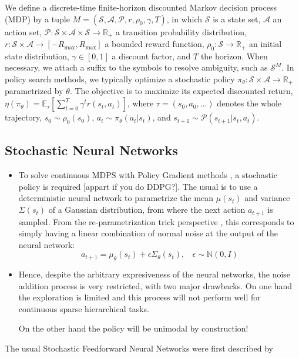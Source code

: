 \documentclass{article} %
\newcommand{\sset}{\mathcal{S}}
\newcommand{\aset}{\mathcal{A}}
\newcommand{\trans}{\mathcal{P}}
\begin{document}
    
    We define a discrete-time finite-horizon discounted Markov decision process (MDP) by a tuple $M = (\sset, \aset, \trans, r, \rho_0, \gamma, T)$, in which $\sset$ is a state set, $\aset$ an action set, $\trans: \sset \times \aset \times \sset \rightarrow \mathbb{R}_{+}$ a transition probability distribution, $r: \sset \times \aset \rightarrow [-R_{\max}, R_{\max}]$ a bounded reward function, $\rho_0: \sset \to \mathbb{R}_+$ an initial state distribution, $\gamma \in [0, 1]$ a discount factor, and $T$ the horizon. When necessary, we attach a suffix to the symbols to resolve ambiguity, such as $\sset^M$. In policy search methods, we typically optimize a stochastic policy $\pi_{\theta}: \sset \times \aset \to \mathbb{R}_+$ parametrized by $\theta$. The objective is to maximize its expected discounted return, $ \eta(\pi_\theta) = \mathbb{E}_{\tau}[ \sum_{t=0}^T \gamma^t r(s_t, a_t) ]$, where $\tau = (s_0, a_0, \ldots)$ denotes the whole trajectory, $\displaystyle s_0 \sim \rho_0(s_0)$, $a_t \sim \pi_\theta(a_t|s_t)$, and $s_{t+1} \sim \trans(s_{t+1} | s_t, a_t)$.

\subsection{Stochastic Neural Networks}

\begin{itemize}
    \item To solve continuous MDPS with Policy Gradient methods \citep{peters2008reinforcement}, a stochastic policy is required [appart if you do DDPG?]. The usual is to use a deterministic neural network to parametrize the mean $\mu(s_t)$ and variance $\Sigma(s_t)$ of a Gaussian distribution, from where the next action $a_{t+1}$ is sampled. From the re-parametrization trick perspective \citep{look at SVG paper or DeepMind-modulate}, this corresponds to simply having a linear combination of normal noise at the output of the neural network:
    \begin{equation}
        a_{t+1} = \mu_{\theta}(s_t) +\epsilon \Sigma_\theta(s_t), ~~~~ \epsilon \sim \mathbb{N}(0,I)
    \end{equation}
    \item Hence, despite the arbitrary expresiveness of the neural networks, the noise addition process is very restricted, with two major drawbacks. On one hand the exploration is limited and this process will not perform well for continuous sparse hierarchical tasks. 
    
    On the other hand the policy will be unimodal by construction!
\end{itemize}
The usual Stochastic Feedforward Neural Networks were first described by \citet{tang2013sfnn}
\end{document}
